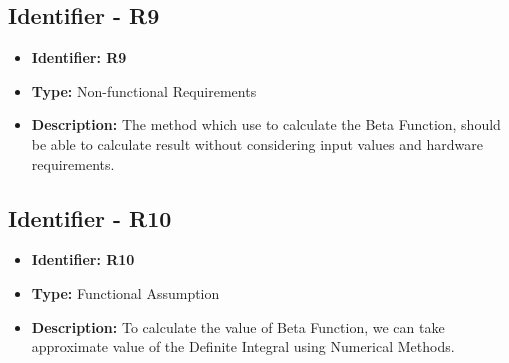 \documentclass[12pt,report]{article}
\begin{document}
\subsection{Identifier - R9}
\begin{itemize}[noitemsep]
    \item \textbf{Identifier: R9}
    \item \textbf{Type: }Non-functional Requirements
    \item \textbf{Description: }The method which use to calculate the Beta Function, should be able to calculate result without considering input values and hardware requirements.
\end{itemize}
\subsection{Identifier - R10}
\begin{itemize}[noitemsep]
    \item \textbf{Identifier: R10}
    \item \textbf{Type: }Functional Assumption
    \item \textbf{Description: }To calculate the value of Beta Function, we can take approximate value of the Definite Integral using Numerical Methods.
\end{itemize}
\end{document}
